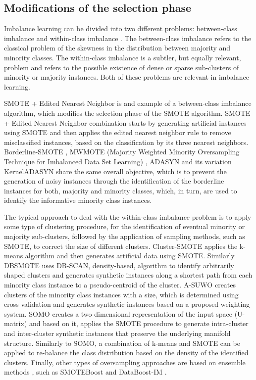 \documentclass[parskip=full]{scrartcl}
\begin{document}
\subsection{Modifications of the selection phase}

Imbalance learning can be divided into two different problems: between-class
imbalance and within-class imbalance \cite{Jo2004}. The between-class imbalance
refers to the classical problem of the skewness in the distribution between
majority and minority classes. The within-class imbalance is a subtler, but
equally relevant, problem and refers to the possible existence of dense or
sparse sub-clusters of minority or majority instances. Both of these problems
are relevant in imbalance learning. 

SMOTE + Edited Nearest Neighbor \cite{Batista2004} is and example of a
between-class imbalance algorithm, which modifies the selection phase of the
SMOTE algorithm. SMOTE + Edited Nearest Neighbor combination starts by
generating artificial instances using SMOTE and then applies the edited nearest
neighbor rule \cite{Wilson1972} to remove misclassified instances, based on the
classification by its three nearest neighbors. Borderline-SMOTE \cite{Han2005},
MWMOTE (Majority Weighted Minority Oversampling Technique for Imbalanced Data
Set Learning) \cite{Barua2014}, ADASYN and its variation KernelADASYN
\cite{Tang2015} share the same overall objective, which is to prevent the
generation of noisy instances through the identification of the borderline
instances for both, majority and minority classes, which, in turn, are used to
identify the informative minority class instances. 

The typical approach to deal with the within-class imbalance  problem is to
apply some type of clustering procedure, for the identification of eventual
minority or majority sub-clusters, followed by the application of sampling
methods, such as SMOTE, to correct the size of different clusters. Cluster-SMOTE
\cite{Cieslak2006} applies the k-means algorithm and then generates artificial
data using SMOTE. Similarly DBSMOTE \cite{Bunkhumpornpat2012} uses DB-SCAN,
density-based, algorithm to identify arbitrarily shaped clusters and generates
synthetic instances along a shortest path from each minority class instance to a
pseudo-centroid of the cluster. A-SUWO \cite{Nekooeimehr2016} creates clusters
of the minority class instances with a size, which is determined using cross
validation and generates synthetic instances based on a proposed weighting
system. SOMO \cite{Douzas2017a} creates a two dimensional representation of the
input space (U-matrix) and based on it, applies the SMOTE procedure to generate
intra-cluster and inter-cluster synthetic instances that preserve the underlying
manifold structure. Similarly to SOMO, a combination of k-means and SMOTE
\cite{Douzas2018} can be applied to re-balance the class distribution based on
the density of the identified clusters. Finally, other types of oversampling
approaches are based on ensemble methods  \cite{Wang2015}, \cite{Sun2015} such
as SMOTEBoost \cite{Chawla2003} and DataBoost-IM \cite{Guo2004}. 
\end{document}

